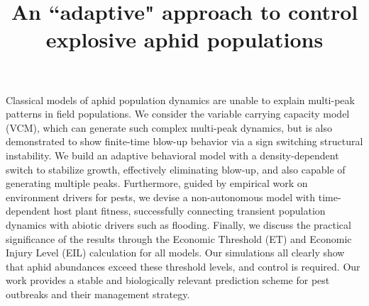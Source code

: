 \documentclass[sn-mathphys-num]{sn-jnl}
\numberwithin{equation}{section}
\numberwithin{equation}{section}
\begin{document}
\title[]{An ``adaptive" approach to control explosive aphid populations}


\author[1]{ }

\author[2]{ }


\author[3]{ }

\author[2]{ }








\abstract
{Classical models of aphid population dynamics are unable to explain multi-peak patterns in field populations. We consider the variable carrying capacity model (VCM), which can generate such complex multi-peak dynamics, but is also demonstrated to show finite-time blow-up behavior via a sign switching structural instability. We build an adaptive behavioral model with a density-dependent switch to stabilize growth, effectively eliminating blow-up, and also capable of generating multiple peaks. Furthermore, guided by empirical work on environment drivers for pests, we devise a non-autonomous model with time-dependent host plant fitness, successfully connecting transient population dynamics with abiotic drivers such as flooding. Finally, we discuss the practical significance of the results through the Economic Threshold (ET) and Economic Injury Level (EIL) calculation for all models. Our simulations all clearly show that aphid abundances exceed these threshold levels, and control is required. Our work provides a stable and biologically relevant prediction scheme for pest outbreaks and their management strategy.}








\maketitle
\end{document}
